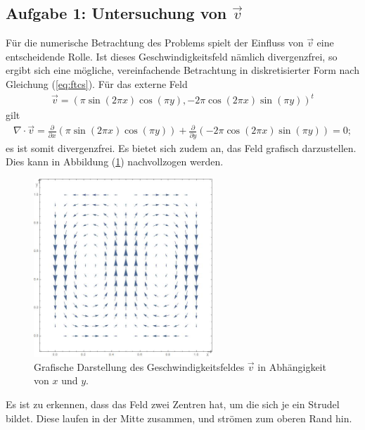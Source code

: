 \documentclass[12pt,a4paper,titlepage,headinclude,bibtotoc]{scrartcl}
\begin{document}
\subsection{Aufgabe 1: Untersuchung von $\vec{v}$}
\label{sec:task1}
Für die numerische Betrachtung des Problems spielt der Einfluss von $\vec{v}$ eine entscheidende Rolle. Ist dieses Geschwindigkeitsfeld nämlich divergenzfrei, so ergibt sich eine mögliche, vereinfachende Betrachtung in diskretisierter Form nach Gleichung (\ref{eq:ftcs}). Für das externe Feld
\begin{align*}
\vec{v} = (\pi \sin(2\pi x) \cos(\pi y), -2 \pi \cos(2\pi x) \sin(\pi y))^t
\end{align*}
gilt
\begin{align*}
\nabla \cdot \vec{v} = \frac{\partial}{\partial x} \left(\pi \sin(2\pi x) \cos(\pi y)\right) + \frac{\partial}{\partial y} \left(-2 \pi \cos(2\pi x) \sin(\pi y)\right) = 0;
\end{align*}
es ist somit divergenzfrei. Es bietet sich zudem an, das Feld grafisch darzustellen. Dies kann in Abbildung (\ref{fig:task1}) nachvollzogen werden.
\begin{figure}[H]
 \centering
   \includegraphics[width=0.6\textwidth]{res/task1.png}
   \caption{Grafische Darstellung des Geschwindigkeitsfeldes $\vec{v}$ in Abhängigkeit von $x$ und $y$.}
 \label{fig:task1}
\end{figure}
Es ist zu erkennen, dass das Feld zwei Zentren hat, um die sich je ein Strudel bildet. Diese laufen in der Mitte zusammen, und strömen zum oberen Rand hin.
\end{document}
